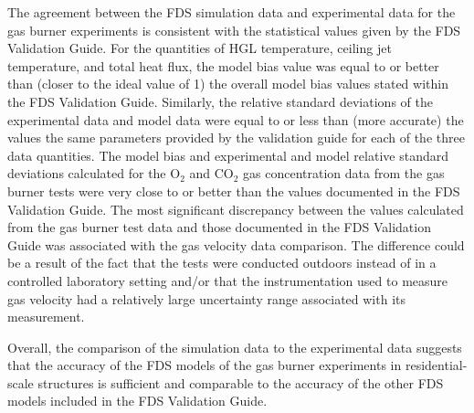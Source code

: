 The agreement between the FDS simulation data and experimental data for the gas burner experiments is consistent with the statistical values given by the FDS Validation Guide. For the quantities of HGL temperature, ceiling jet temperature, and total heat flux, the model bias value was equal to or better than (closer to the ideal value of 1) the overall model bias values stated within the FDS Validation Guide. Similarly, the relative standard deviations of the experimental data and model data were equal to or less than (more accurate) the values the same parameters provided by the validation guide for each of the three data quantities. The model bias and experimental and model relative standard deviations calculated for the O$_2$ and CO$_2$ gas concentration data from the gas burner tests were very close to or better than the values documented in the FDS Validation Guide. The most significant discrepancy between the values calculated from the gas burner test data and those documented in the FDS Validation Guide was associated with the gas velocity data comparison. The difference could be a result of the fact that the tests were conducted outdoors instead of in a controlled laboratory setting and/or that the instrumentation used to measure gas velocity had a relatively large uncertainty range associated with its measurement.

Overall, the comparison of the simulation data to the experimental data suggests that the accuracy of the FDS models of the gas burner experiments in residential-scale structures is sufficient and comparable to the accuracy of the other FDS models included in the FDS Validation Guide.
